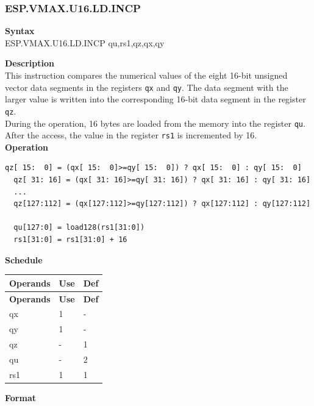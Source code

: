 \newpage
\subsubsection{ESP.VMAX.U16.LD.INCP}\label{instruction:ESPVMAXU16LDINCP}
\textbf{Syntax}\\
ESP.VMAX.U16.LD.INCP qu,rs1,qz,qx,qy

\textbf{Description}\\
This instruction compares the numerical values of the eight 16-bit unsigned vector data segments in the registers \lstinline{qx} and \lstinline{qy}. The data segment with the larger value is written into the corresponding 16-bit data segment in the register \lstinline{qz}.\\During the operation, 16 bytes are loaded from the memory into the register \lstinline{qu}. After the access, the value in the register \lstinline{rs1} is incremented by 16.\\
\textbf{Operation}
\begin{lstlisting}[escapeinside=`?]
  qz[ 15:  0] = (qx[ 15:  0]>=qy[ 15:  0]) ? qx[ 15:  0] : qy[ 15:  0]
  qz[ 31: 16] = (qx[ 31: 16]>=qy[ 31: 16]) ? qx[ 31: 16] : qy[ 31: 16]
  ...
  qz[127:112] = (qx[127:112]>=qy[127:112]) ? qx[127:112] : qy[127:112]

  qu[127:0] = load128(rs1[31:0])
  rs1[31:0] = rs1[31:0] + 16
\end{lstlisting}


\textbf{Schedule}\\
\begin{longtable}[c]{|l|l|l|}
    \hline
    \rowcolor{lightgray}
    \textbf{Operands} & \textbf{Use} & \textbf{Def} \\\hline
    \endfirsthead
    \hline
    \rowcolor{lightgray}
     \textbf{Operands} & \textbf{Use} & \textbf{Def} \\\hline
    \endhead
    \hline
    \endfoot

    qx & 1 & - \\\hline
  qy & 1 & - \\\hline
     qz & - & 1 \\\hline
     qu & - & 2 \\\hline
     rs1 & 1 & 1

\end{longtable}

\textbf{Format}\\

